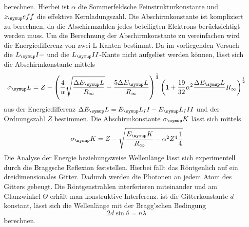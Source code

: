 berechnen. Hierbei ist $\alpha$ die Sommerfeldsche Feinstrukturkonstante und
$z_\su{eff}$ die effektive Kernladungszahl.
Die Abschirmkonstante ist kompliziert zu berechnen, da die Abschirmzahlen
jedes beteiligten Elektrons berücksichtigt werden muss. Um die Berechnung der
Abschirmkonstante zu vereinfachen wird die Energiedifferenz von zwei L-Kanten
bestimmt.
Da im vorliegenden Versuch die $L_\su{I}-$ und die $L_\su{II}$-Kante nicht
aufgelöst werden können, lässt sich die Abschirmkonstante mittels
\begin{equation}
  \sigma_\su{L}=Z-\left(\frac{4}{\alpha}\sqrt{\frac{\Delta E_\su{L}}{R_\infty}
  }-\frac{5\Delta E_\su{L}}{R_\infty}\right)^{\frac{1}{2}}\left(1+\frac{19}{32}
  \alpha^2\frac{\Delta E_\su{L}}{}R_\infty\right)^{\frac{1}{2}}
  \label{abschirmL}
\end{equation}
aus der Energiedifferenz $\Delta E_\su{L}=E_\su{L_II}-E_\su{L_III}$ und der
Ordnungszahl $Z$ bestimmen.
Die Abschirmkonstante $\sigma_\su{K}$ lässt sich mittels
\begin{equation}
  \sigma_\su{K}=Z-\sqrt{\frac{E_\su{K}}{R_\infty}-\alpha^2Z^4\frac{1}{4}}
  \label{abschirmK}
\end{equation}
Die Analyse der Energie beziehungsweise Wellenlänge
lässt sich experimentell durch die Braggsche Reflexion feststellen. Hierbei
fällt das Röntgenlich auf ein dreidimensionales Gitter. Dadurch werden die
Photonen an jedem Atom des Gitters gebeugt. Die Röntgenstrahlen interferieren
miteinander und am Glanzwinkel $\Theta$ erhält man konstruktive Interferenz.
ist die Gitterkonstante $d$ konstant, lässt sich die Wellenlänge mit der
Bragg'schen Bedingung
\begin{equation}
  2d\sin\theta=n\lambda
  \label{bragg}
\end{equation}
berechnen.
